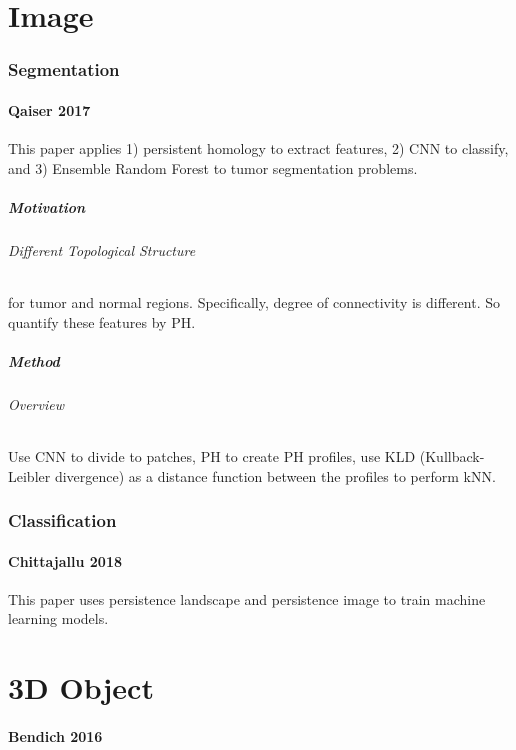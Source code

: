 \documentclass[10pt,a4paper]{article}
\begin{document}
\part{Image}
\section{Segmentation}
\subsection{Qaiser 2017}
This paper \cite{Qaiser2017} applies 1) persistent homology to extract features, 2) CNN to classify, and 3) Ensemble Random Forest to tumor segmentation problems.\\
\subsubsection{Motivation}
\paragraph{Different Topological Structure} for tumor and normal regions. Specifically, degree of connectivity is different. So quantify these features by PH.
\subsubsection{Method}
\paragraph{Overview}
Use CNN to divide to patches, PH to create PH profiles, use KLD (Kullback-Leibler divergence) as a distance function between the profiles to perform kNN.
\section{Classification}
\subsection{Chittajallu 2018}
This paper \cite{Chittajallu2018} uses persistence landscape and persistence image to train machine learning models.
\part{3D Object}

\subsection{Bendich 2016}
\newpage


\end{document}
